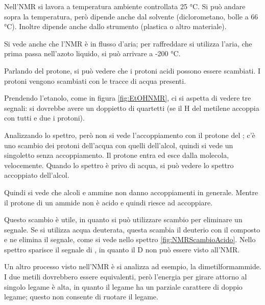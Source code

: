 Nell'NMR si lavora a temperatura ambiente controllata 25 °C. Si può
andare sopra la temperatura, però dipende anche dal solvente
(diclorometano, bolle a 66 °C). Inoltre dipende anche dallo strumento
(plastica o altro materiale).

Si vede anche che l'NMR è in flusso d'aria; per raffreddare si utilizza
l'aria, che prima passa nell'azoto liquido, si può arrivare a -200 °C.


Parlando del protone, si può vedere che i protoni acidi possono essere
scambiati. I protoni vengono scambiati con le tracce di acqua presenti.

Prendendo l'etanolo, come in figura \ref{fig:EtOHNMR}, ci si aspetta di vedere tre segnali: si dovrebbe
avere un doppietto di quartetti (se il H del metilene accoppia con tutti
e due i protoni).

Analizzando lo spettro, però non si vede l'accoppiamento con il protone
del ; c'è uno scambio dei protoni dell'acqua con quelli dell'alcol,
quindi si vede un singoletto senza accoppiamento. Il protone entra ed
esce dalla molecola, velocemente.
Quando lo spettro è privo di acqua, si può vedere lo spettro accoppiato
dell'alcol.

Quindi si vede che alcoli e ammine non danno accoppiamenti in generale.
Mentre il protone di un ammide non è acido e quindi riesce ad
accoppiare.

Questo scambio è utile, in quanto si può utilizzare scambio per
eliminare un segnale. Se si utilizza acqua deuterata, questa scambia il
deuterio con il composto e ne elimina il segnale, come si vede nello spettro \ref{fig:NMRScambioAcido}. Nello spettro sparisce il segnale di , in quanto il D non può essere
visto all'NMR.



Un altro processo visto nell'NMR è si analizza ad esempio, la
dimetilformammide. I due metili dovrebbero essere equivalenti, però l'energia per girare
attorno al singolo legame è alta, in quanto il legame ha un parziale
carattere di doppio legame; questo non consente di ruotare il legame.

